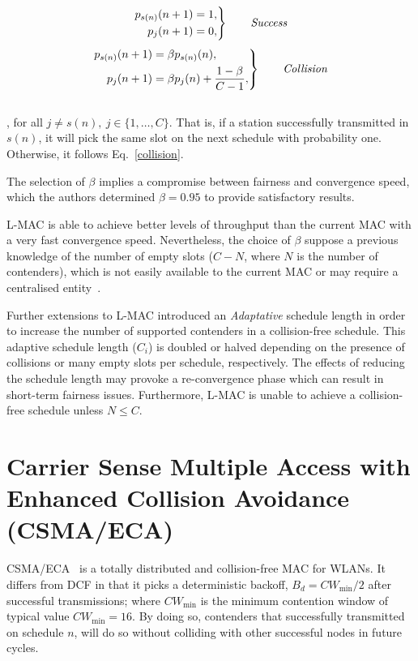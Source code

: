 \documentclass[a4paper,journal]{IEEEtran}
\begin{document}
\begin{equation} \label{success}
		\left. \begin{aligned}
			p_{s(n)}(n+1)&=1,\\
			p_{j}(n+1)&=0,
		\end{aligned}
	\right\}
	\qquad \text{\emph{Success}}
\end{equation}
\begin{equation} \label{collision}
	\left. \begin{aligned}
			p_{s(n)}(n+1)&=\beta p_{s(n)}(n),\\
			p_{j}(n+1)&=\beta p_{j}(n)+\frac{1-\beta}{C -1},
		\end{aligned}
	\right\}
	\qquad \text{\emph{Collision}}
\end{equation}
\\
, for all $j\neq s(n),~j\in \{1,\dots ,C\}$. That is, if a station successfully transmitted in $s(n)$, it will pick the same slot on the next schedule with probability one. Otherwise, it follows Eq.~\ref{collision}.

The selection of $\beta$ implies a compromise between fairness and convergence speed, which the authors determined $\beta=0.95$ to provide satisfactory results.

L-MAC is able to achieve better levels of throughput than the current MAC with a very fast convergence speed. Nevertheless, the choice of $\beta$ suppose a previous knowledge of the number of empty slots ($C-N$, where $N$ is the number of contenders), which is not easily available to the current MAC or may require a centralised entity~\cite{barcelo2011tcf}.

Further extensions to L-MAC introduced an \emph{Adaptative} schedule length in order to increase the number of supported contenders in a collision-free schedule. This adaptive schedule length ($C_{i}$) is doubled or halved depending on the presence of collisions or many empty slots per schedule, respectively. The effects of reducing the schedule length may provoke a re-convergence phase which can result in short-term fairness issues. Furthermore, L-MAC is unable to achieve a collision-free schedule unless $N\leq C$.

\section{Carrier Sense Multiple Access with Enhanced Collision Avoidance (CSMA/ECA)}\label{introProtocol}
CSMA/ECA~\cite{barcelo2008lba} is a totally distributed and collision-free MAC for WLANs. It differs from DCF in that it picks a deterministic backoff, $B_{d}=CW_{\min}/2$ after successful transmissions; where $CW_{\min}$ is the minimum contention window of typical value $CW_{\min}=16$. By doing so, contenders that successfully transmitted on schedule $n$, will do so without colliding with other successful nodes in future cycles.
\end{document}
